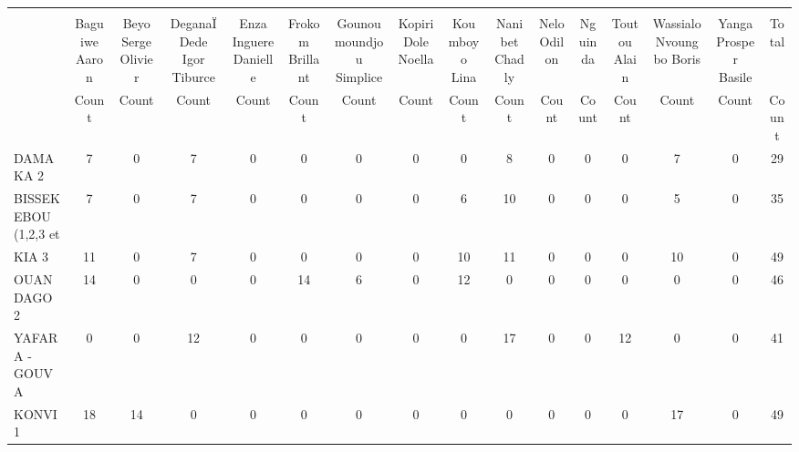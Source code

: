 {
\def\sym#1{\ifmmode^{#1}\else\(^{#1}\)\fi}
\begin{tabular}{l*{15}{c}}
\hline\hline
            &\multicolumn{15}{c}{}                                                                                                                                                                                                                          \\
            &  Baguiwe Aaron&Beyo Serge Olivier&DeganaÏ Dede Igor Tiburce&Enza Inguere Danielle&Frokom Brillant&Gounoumoundjou Simplice&Kopiri Dole Noella&  Koumboyo Lina& Nanibet Chadly&    Nelo Odilon&        Nguinda&   Toutou Alain&Wassialo Nvoungbo Boris&Yanga Prosper Basile&          Total\\
            &          Count&          Count&          Count&          Count&          Count&          Count&          Count&          Count&          Count&          Count&          Count&          Count&          Count&          Count&          Count\\
\hline
DAMAKA 2    &              7&              0&              7&              0&              0&              0&              0&              0&              8&              0&              0&              0&              7&              0&             29\\
BISSEKEBOU (1,2,3 et&              7&              0&              7&              0&              0&              0&              0&              6&             10&              0&              0&              0&              5&              0&             35\\
KIA 3       &             11&              0&              7&              0&              0&              0&              0&             10&             11&              0&              0&              0&             10&              0&             49\\
OUANDAGO  2 &             14&              0&              0&              0&             14&              6&              0&             12&              0&              0&              0&              0&              0&              0&             46\\
YAFARA - GOUVA&              0&              0&             12&              0&              0&              0&              0&              0&             17&              0&              0&             12&              0&              0&             41\\
KONVI 1     &             18&             14&              0&              0&              0&              0&              0&              0&              0&              0&              0&              0&             17&              0&             49\\

\end{tabular}}
